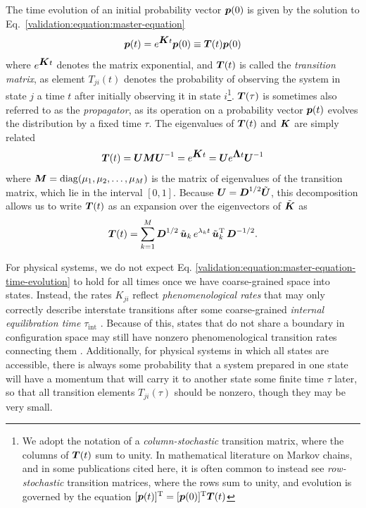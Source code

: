 The time evolution of an initial probability vector ${\mbox{\boldmath{$p$}}}(0)$ is given by the solution to Eq.\ \ref{validation:equation:master-equation}
\begin{equation}
{\mbox{\boldmath{$p$}}}(t) = e^{{\mbox{\boldmath{$K$}}} t} {\mbox{\boldmath{$p$}}}(0) \equiv {\mbox{\boldmath{$T$}}}(t) {\mbox{\boldmath{$p$}}}(0) \label{validation:equation:master-equation-time-evolution}
\end{equation}
where $e^{{\mbox{\boldmath{$K$}}} t}$ denotes the matrix exponential, and ${\mbox{\boldmath{$T$}}}(t)$ is called the \emph{transition matrix}, as element $T_{ji}(t)$ denotes the probability of observing the system in state $j$ a time $t$ after initially observing it in state $i$\footnote{We adopt the notation of a \emph{column-stochastic} transition matrix, where the columns of ${\mbox{\boldmath{$T$}}}(t)$ sum to unity. In mathematical literature on Markov chains, and in some publications cited here, it is often common to instead see \emph{row-stochastic} transition matrices, where the rows sum to unity, and evolution is governed by the equation $[{\mbox{\boldmath{$p$}}}(t)]^{\mathrm{T}} = [{\mbox{\boldmath{$p$}}}(0)]^{\mathrm{T}} {\mbox{\boldmath{$T$}}}(t)$}.
${\mbox{\boldmath{$T$}}}(\tau)$ is sometimes also referred to as the \emph{propagator}, as its operation on a probability vector ${\mbox{\boldmath{$p$}}}(t)$ evolves the distribution by a fixed time $\tau$.  
The eigenvalues of ${\mbox{\boldmath{$T$}}}(t)$ and ${\mbox{\boldmath{$K$}}}$ are simply related
\begin{equation}
{\mbox{\boldmath{$T$}}}(t) = {\mbox{\boldmath{$U$}}} {\mbox{\boldmath{$M$}}} {\mbox{\boldmath{$U$}}}^{-1} = e^{{\mbox{\boldmath{$K$}}} t} = {\mbox{\boldmath{$U$}}} e^{{\mbox{\boldmath{$\Lambda$}}} t} {\mbox{\boldmath{$U$}}}^{-1} \label{validation:equation:relation-between-eigenvalues-of-transition-and-rate-matrix}
\end{equation}
where ${\mbox{\boldmath{$M$}}} = \mathrm{diag}(\mu_1, \mu_2, \ldots, \mu_M)$ is the matrix of eigenvalues of the transition matrix, which lie in the interval $[0,1]$.
Because ${\mbox{\boldmath{$U$}}} = {\mbox{\boldmath{$D$}}}^{1/2} \tilde{{\mbox{\boldmath{$U$}}}}$, this decomposition allows us to write ${\mbox{\boldmath{$T$}}}(t)$ as an expansion over the eigenvectors of $\tilde{{\mbox{\boldmath{$K$}}}}$ as
\begin{equation}
{\mbox{\boldmath{$T$}}}(t) = \sum_{k=1}^M {\mbox{\boldmath{$D$}}}^{{1/2}} \, \tilde{{\mbox{\boldmath{$u$}}}}_k \, e^{\lambda_k t} \, \tilde{{\mbox{\boldmath{$u$}}}}_k^{\mathrm{T}} \, {\mbox{\boldmath{$D$}}}^{-{1/2}} . \label{validation:equation:eigenvector-expansion-of-transition-matrix}
\end{equation}

For physical systems, we do not expect Eq. \ref{validation:equation:master-equation-time-evolution} to hold for all times once we have coarse-grained space into states.
Instead, the rates $K_{ji}$ reflect \emph{phenomenological rates} that may only correctly describe interstate transitions after some coarse-grained \emph{internal equilibration time} $\tau_{\mathrm{int}}$ \cite{chandler:1978a}.
Because of this, states that do not share a boundary in configuration space may still have nonzero phenomenological transition rates connecting them \cite{voter:1985a}.
Additionally, for physical systems in which all states are accessible, there is always some probability that a system prepared in one state will have a momentum that will carry it to another state some finite time $\tau$ later, so that all transition elements $T_{ji}(\tau)$ should be nonzero, though they may be very small.

